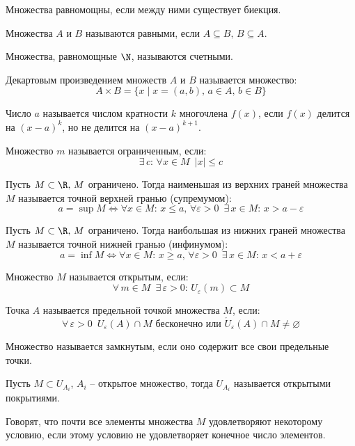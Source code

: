 \documentclass[12pt]{article}
\begin{document}
\begin{definition}
    Множества равномощны, если между ними существует биекция.
\end{definition}
\begin{definition}
    Множества $A$ и $B$ называются равными, если $A\subseteq B,\,B\subseteq A.$
\end{definition}
\begin{definition}
    Множества, равномощные $\N$, называются счетными.
\end{definition}
\begin{definition}
    Декартовым произведением множеств $A$ и $B$ называется множество:
    $$A\times B=\{x\mid x=(a,b),\,a\in A,\,b\in B\}$$
\end{definition}
\begin{definition}
    Число $a$ называется числом кратности $k$ многочлена $f(x)$, если $f(x)$ делится на $(x-a)^k$, но не делится на $(x-a)^{k+1}$.
\end{definition}
\begin{definition}
    Множество $m$ называется ограниченным, если:
    $$\exists\, c:\,\forall x\in M\enspace |x| \leq c$$
\end{definition}
\begin{definition}
    Пусть $M \subset \R,\,M$ ограничено. Тогда наименьшая из верхних граней множества $M$ называется точной верхней гранью (супремумом):
    $$a=\sup M\Longleftrightarrow \forall x \in M:\, x \leq a,\, \forall \varepsilon>0\enspace \exists\, x \in M:\, x>a-\varepsilon$$
\end{definition}
\begin{definition}
    Пусть $M \subset \R,\,M$ ограничено. Тогда наибольшая из нижних граней множества $M$ называется точной нижней гранью (инфинумом):
    $$a=\inf M\Longleftrightarrow \forall x \in M:\, x \geq a,\, \forall \varepsilon>0\enspace \exists\, x \in M:\, x<a+\varepsilon$$
\end{definition}
\begin{definition}
    Множество $M$ называется открытым, если:
    $$\forall\,m\in M\enspace\exists\,\varepsilon>0:\,U_\varepsilon(m)\subset M$$
\end{definition}
\begin{definition}
    Точка $A$ называется предельной точкой множества $M$, если:
    $$\forall\,\varepsilon>0\enspace U_\varepsilon(A)\cap M\text{ бесконечно или } \mathring{U}_\varepsilon(A)\cap M\neq \varnothing$$
\end{definition}
\begin{definition}
    Множество называется замкнутым, если оно содержит все свои предельные точки.
\end{definition}
\begin{definition}
    Пусть $M\subset U_{A_i}$, $A_i$ -- открытое множество, тогда $U_{A_i}$ называется открытыми покрытиями.
\end{definition}
\begin{definition}
    Говорят, что почти все элементы множества $M$ удовлетворяют некоторому условию, если этому условию не удовлетворяет конечное число элементов.
\end{definition}
\end{document}
